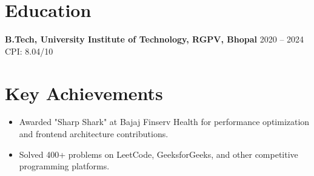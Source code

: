 \documentclass[10.5pt,letterpaper]{article}
\newcommand{\resumeItem}[1]{\item[--] #1}
\newenvironment{resumeItemize}{\begin{itemize}[leftmargin=*,itemsep=1pt,topsep=2pt,parsep=0pt]}{\end{itemize}}
\begin{document}
\section*{Education}
\textbf{B.Tech, University Institute of Technology, RGPV, Bhopal} \hfill 2020 -- 2024 \\
CPI: 8.04/10

\section*{Key Achievements}
\begin{resumeItemize}
    \resumeItem{Awarded "Sharp Shark" at Bajaj Finserv Health for performance optimization and frontend architecture contributions.}
    \resumeItem{Solved 400+ problems on LeetCode, GeeksforGeeks, and other competitive programming platforms.}
\end{resumeItemize}
\end{document}
